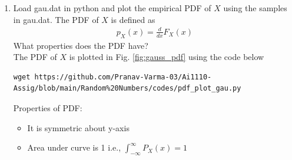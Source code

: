 \documentclass[journal,12pt,twocolumn]{IEEEtran}
\renewcommand\thesection{\arabic{section}}
\begin{document}
\begin{enumerate}[label=\textbf{\thesection.\arabic*},ref=\thesection.\theenumi]
\item
Load gau.dat in python and plot the empirical PDF of $X$ using the samples in gau.dat. The PDF of $X$ is defined as
\begin{align}
p_{X}(x) = \frac{d}{dx}F_{X}(x)
\end{align}
What properties does the PDF have?\\
\solution The PDF of $X$ is plotted in Fig. \ref{fig:gauss_pdf} using the code below
\begin{lstlisting}
wget https://github.com/Pranav-Varma-03/Ai1110-Assig/blob/main/Random%20Numbers/codes/pdf_plot_gau.py
\end{lstlisting}
Properties of PDF:
\begin{itemize}
    \item It is symmetric about y-axis
    \item Area under curve is 1 i.e., $\int_{-\infty}^{\infty} P_X(x) = 1$
\end{itemize}


\end{enumerate}
\end{document}
